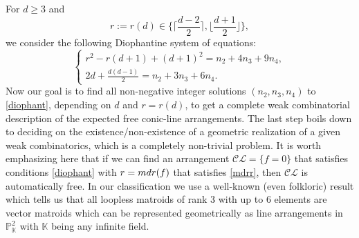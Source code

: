 \documentclass[12pt]{article}
\theoremstyle{plain}
\theoremstyle{definition}
\renewcommand\geq{\geqslant}
\begin{document}
\noindent
For $d\geq 3$ and 
\begin{equation}
\label{mdrr}
r:=r(d) \in \bigg\{\bigg\lceil \frac{d-2}{2} \bigg\rceil, \bigg\lfloor \frac{d+1}{2} \bigg \rfloor \bigg\},
\end{equation}
we consider the following Diophantine system of equations:
\begin{equation}
\label{diophant}
\begin{cases}
    r^{2} - r(d+1) + (d+1)^2  = n_{2} + 4n_{3} + 9n_{4}, \\
    2d + \frac{d(d-1)}{2} = n_{2} + 3n_{3} + 6n_{4}.
\end{cases}
\end{equation}
Now our goal is to find all non-negative integer solutions $(n_{2},n_{3},n_{4})$ to \eqref{diophant}, depending on $d$ and $r=r(d)$, to get a complete weak combinatorial description of the expected free conic-line arrangements. The last step boils down to deciding on the existence/non-existence of a geometric realization of a given weak combinatorics, which is a completely non-trivial problem. It is worth emphasizing here that if we can find an arrangement $\mathcal{CL} = \{f=0\}$ that satisfies conditions \eqref{diophant} with $r={\rm mdr}(f)$ that satisfies \eqref{mdrr}, then $\mathcal{CL}$ is automatically free. In our classification we use a well-known (even folkloric) result which tells us that all loopless matroids of rank $3$ with up to $6$ elements are vector matroids which can be represented geometrically as line arrangements in $\mathbb{P}^{2}_{\mathbb{K}}$ with $\mathbb{K}$ being any infinite field.
\end{document}

